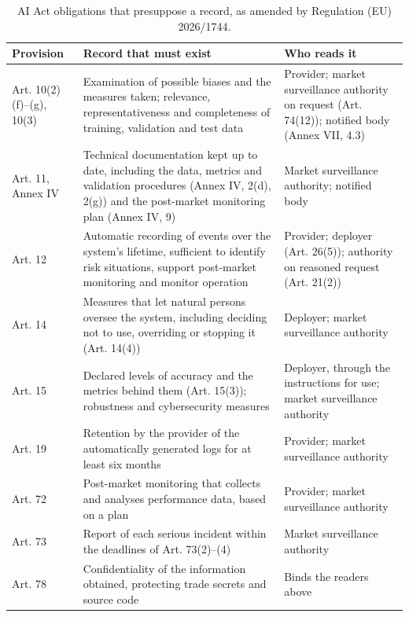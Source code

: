 \begin{table}[t]
\caption{AI Act obligations that presuppose a record, as amended by Regulation (EU) 2026/1744.}
\label{tab:obligations}
\footnotesize
\begin{tabularx}{\textwidth}{@{}>{\raggedright\arraybackslash}p{}LL@{}}
\toprule
Provision & Record that must exist & Who reads it \\
\midrule
Art. 10(2)(f)--(g), 10(3) & Examination of possible biases and the measures taken; relevance, representativeness and completeness of training, validation and test data & Provider; market surveillance authority on request (Art. 74(12)); notified body (Annex VII, 4.3) \\
Art. 11, Annex IV & Technical documentation kept up to date, including the data, metrics and validation procedures (Annex IV, 2(d), 2(g)) and the post-market monitoring plan (Annex IV, 9) & Market surveillance authority; notified body \\
Art. 12 & Automatic recording of events over the system's lifetime, sufficient to identify risk situations, support post-market monitoring and monitor operation & Provider; deployer (Art. 26(5)); authority on reasoned request (Art. 21(2)) \\
Art. 14 & Measures that let natural persons oversee the system, including deciding not to use, overriding or stopping it (Art. 14(4)) & Deployer; market surveillance authority \\
Art. 15 & Declared levels of accuracy and the metrics behind them (Art. 15(3)); robustness and cybersecurity measures & Deployer, through the instructions for use; market surveillance authority \\
Art. 19 & Retention by the provider of the automatically generated logs for at least six months & Provider; market surveillance authority \\
Art. 72 & Post-market monitoring that collects and analyses performance data, based on a plan & Provider; market surveillance authority \\
Art. 73 & Report of each serious incident within the deadlines of Art. 73(2)--(4) & Market surveillance authority \\
Art. 78 & Confidentiality of the information obtained, protecting trade secrets and source code & Binds the readers above \\
\bottomrule
\end{tabularx}
\end{table}
